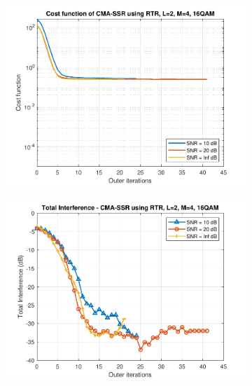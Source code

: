 \begin{figure}
\begin{subfigure}[b]{0.45\textwidth}
		\includegraphics[width=\linewidth]{./figs/BF_RTR_cost_16QAM_L=2_M=4_K=1000.pdf}
		\label{fig:rtr_cost16}
	\end{subfigure}
	\begin{subfigure}[b]{0.45\textwidth}
		\includegraphics[width=\linewidth]{./figs/BF_RTR_TI_16QAM_L=2_M=4_K=1000.pdf}
		\label{fig:rtr_ti16}
	\end{subfigure}
	\begin{subfigure}[b]{0.45\textwidth}

\end{subfigure}
\end{figure}
